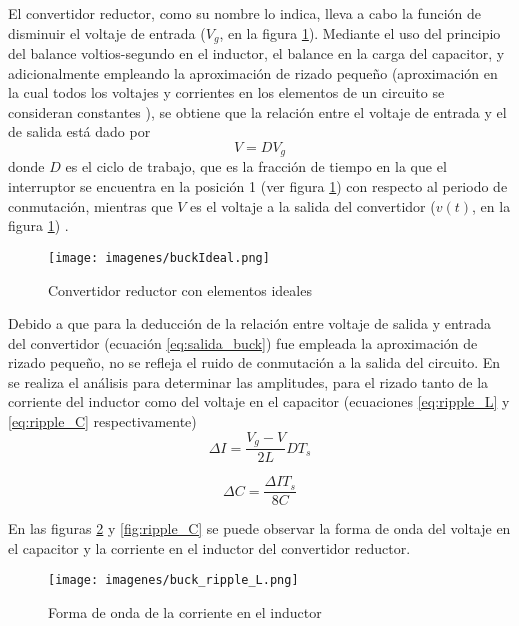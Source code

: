 El convertidor reductor, como su nombre lo indica, lleva a cabo la función de disminuir
 el voltaje de entrada ($V_g$, en la figura \ref{fig:buck}). Mediante el uso del principio del
balance voltios-segundo en el inductor, el balance en la carga del capacitor, y
 adicionalmente empleando la aproximación de rizado pequeño (aproximación en la cual todos los 
voltajes y corrientes en los elementos de un circuito se consideran constantes  \cite{erickson_fundamentals_2020}),
 se obtiene que la relación entre el voltaje de entrada y el de salida está dado por 
 \begin{equation}
    V=DV_g  
    \label{eq:salida_buck}
 \end{equation}
donde $D$ es el ciclo de trabajo, que es la fracción de tiempo en la que el
interruptor se encuentra en la posición 1 (ver figura \ref{fig:buck}) con
respecto al periodo de conmutación, mientras que $V$ es el voltaje 
a la salida del convertidor ($v(t)$, en la figura \ref{fig:buck})
 \cite{erickson_fundamentals_2020}. 



\begin{figure}[H]
    \centering
    \texttt{[image: imagenes/buckIdeal.png]}
    \caption{Convertidor reductor con elementos ideales \cite{erickson_fundamentals_2020}}
    \label{fig:buck}
\end{figure}

Debido a que para la deducción de la relación entre voltaje de salida y 
entrada del convertidor (ecuación \ref{eq:salida_buck}) fue empleada la
aproximación de rizado pequeño, no se refleja el ruido de conmutación 
a la salida del circuito. En \cite{erickson_fundamentals_2020} se 
realiza el análisis para determinar las amplitudes, para el rizado tanto de 
la corriente del inductor como del voltaje en el capacitor (ecuaciones 
\ref{eq:ripple_L} y \ref{eq:ripple_C} respectivamente)
\begin{equation}
    \Delta I = \frac{V_g-V}{2L}DT_s
    \label{eq:ripple_L}
\end{equation}

\begin{equation}
    \Delta C = \frac{\Delta I T_s}{8C}
    \label{eq:ripple_C}
\end{equation}

En las figuras \ref{fig:ripple_L} y \ref{fig:ripple_C} se puede observar la forma de onda del voltaje
en el capacitor y la corriente en el inductor del convertidor reductor.

\begin{figure}[H]
    \centering
    \texttt{[image: imagenes/buck\_ripple\_L.png]}
    \caption{Forma de onda de la corriente en el inductor \cite{erickson_fundamentals_2020}}
    \label{fig:ripple_L}
\end{figure}

